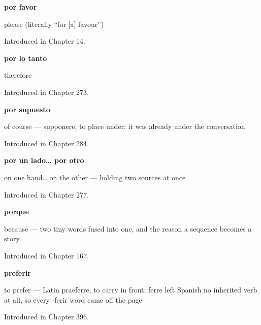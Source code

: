 \noindent\begin{minipage}[t]{\linewidth}
\raggedright
\textbf{por favor}\par
\small please (literally \textquotedblleft{}for {[}a{]} favour\textquotedblright{})\par
\footnotesize Introduced in Chapter 14.
\end{minipage}\par\medskip

\noindent\begin{minipage}[t]{\linewidth}
\raggedright
\textbf{por lo tanto}\par
\small therefore\par
\footnotesize Introduced in Chapter 273.
\end{minipage}\par\medskip

\noindent\begin{minipage}[t]{\linewidth}
\raggedright
\textbf{por supuesto}\par
\small of course — supponere, to place under: it was already under the conversation\par
\footnotesize Introduced in Chapter 284.
\end{minipage}\par\medskip

\noindent\begin{minipage}[t]{\linewidth}
\raggedright
\textbf{por un lado… por otro}\par
\small on one hand… on the other — holding two sources at once\par
\footnotesize Introduced in Chapter 277.
\end{minipage}\par\medskip

\noindent\begin{minipage}[t]{\linewidth}
\raggedright
\textbf{porque}\par
\small because — two tiny words fused into one, and the reason a sequence becomes a story\par
\footnotesize Introduced in Chapter 167.
\end{minipage}\par\medskip

\noindent\begin{minipage}[t]{\linewidth}
\raggedright
\textbf{preferir}\par
\small to prefer — Latin praeferre, to carry in front; ferre left Spanish no inherited verb at all, so every -ferir word came off the page\par
\footnotesize Introduced in Chapter 396.
\end{minipage}\par\medskip

